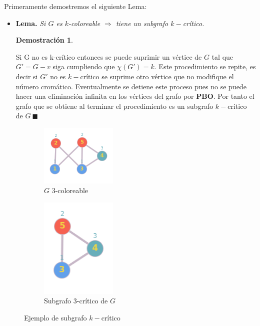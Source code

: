 \documentclass[a4paper,1pt]{report}
\newtheorem*{dem}{Demostración}
\begin{document}
Primeramente demostremos el siguiente Lema:
\begin{itemize}
    \item[]\textbf{Lema.}\textit{ Si $G$ es $k$-coloreable $\Rightarrow$ tiene un subgrafo $k-$cr\'itico.}

    \begin{dem}        
    \end{dem}
    Si G no es k-crítico entonces se puede suprimir un v\'ertice de $G$ tal que $G' = G-v$ siga cumpliendo que $\chi(G') = k$. 
    Este procedimiento se repite, es decir si $G'$ no es $k-$cr\'itico se suprime otro v\'ertice que no modifique el n\'umero crom\'atico.
    Eventualmente se detiene este proceso pues no se puede hacer una eliminaci\'on infinita en los v\'ertices del grafo por \textbf{PBO}. Por tanto el grafo que se obtiene al terminar el procedimiento es un subgrafo $k-$critico de $G \ \blacksquare$
\end{itemize}

\begin{figure}[H]
    \centering
    \begin{subfigure}[b]{0.55\textwidth}
        \centering
        \includegraphics[width=0.4\textwidth]{figures6/otroGcol.png}
        \caption{$G$ 3-coloreable}
    \end{subfigure} 
    \begin{subfigure}[b]{0.35\textwidth}
        \centering
        \includegraphics[width=0.4\textwidth]{figures6/3criticoSubG.png}
        \caption{Subgrafo $3$-cr\'itico de $G$}
    \end{subfigure}
    \caption{Ejemplo de subgrafo $k-$cr\'itico}
\end{figure} 
    
\end{document}
